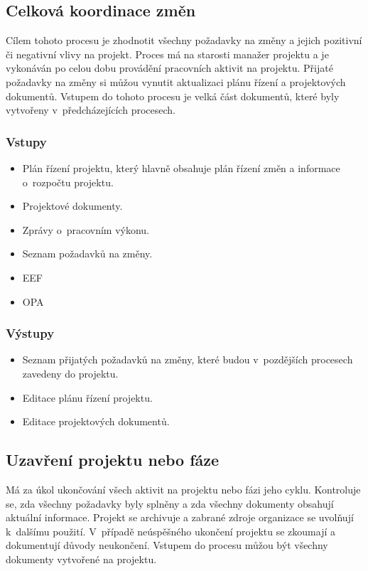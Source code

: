 \subsection*{Celková koordinace změn}

Cílem tohoto procesu je zhodnotit všechny požadavky na změny a jejich pozitivní či negativní vlivy na projekt. Proces má na starosti manažer projektu a je vykonáván po celou dobu provádění pracovních aktivit na projektu. Přijaté požadavky na změny si můžou vynutit aktualizaci plánu řízení a projektových dokumentů. Vstupem do tohoto procesu je velká část dokumentů, které byly vytvořeny v~předcházejících procesech. 

\subsubsection*{Vstupy}
\begin{itemize}
    \item Plán řízení projektu, který hlavně obsahuje plán řízení změn a informace o~rozpočtu projektu.
    \item Projektové dokumenty.
    \item Zprávy o~pracovním výkonu.
    \item Seznam požadavků na změny.
    \item EEF
    \item OPA
\end{itemize}
\subsubsection*{Výstupy}
\begin{itemize}
    \item Seznam přijatých požadavků na změny, které budou v~pozdějších procesech zavedeny do projektu.
    \item Editace plánu řízení projektu.
    \item Editace projektových dokumentů.
\end{itemize}


\subsection*{Uzavření projektu nebo fáze}

Má za úkol ukončování všech aktivit na projektu nebo fázi jeho cyklu. Kontroluje se, zda všechny požadavky byly splněny a zda všechny dokumenty obsahují aktuální informace. Projekt se archivuje a zabrané zdroje organizace se uvolňují k~dalšímu použití. V~případě neúspěšného ukončení projektu se zkoumají a dokumentují důvody neukončení. Vstupem do procesu můžou být všechny dokumenty vytvořené na projektu.

